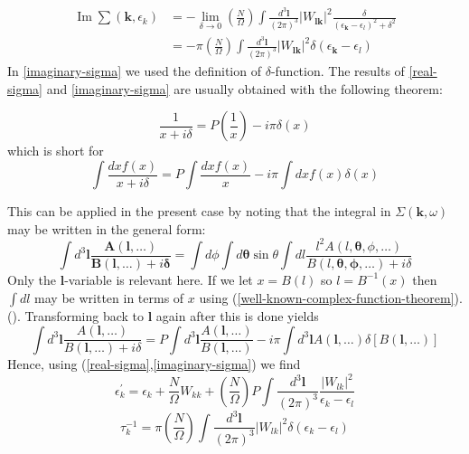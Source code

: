 \begin{equation}\begin{aligned}
\operatorname{Im} \sum\left(\mathbf{k}, \epsilon_{k}\right) &=-\lim _{\delta \rightarrow 0}\left(\frac{N}{\Omega}\right) \int \frac{d^{3} \mathbf{l}}{(2 \pi)^{3}}\left|W_{\mathbf{lk}}\right|^{2} \frac{\delta}{\left(\epsilon_{\mathbf{k}}-\epsilon_{l}\right)^{2}+\delta^{2}} \\
&=-\pi\left(\frac{N}{\Omega}\right) \int \frac{d^{3} \mathbf{l}}{(2 \pi)^{3}}\left|W_{\mathbf{lk}}\right|^{2} \delta\left(\epsilon_{\mathbf{k}}-\epsilon_{l}\right)
\end{aligned}\end{equation}
In \ref{imaginary-sigma} we used the  definition of $\delta$-function. The results of \ref{real-sigma} and \ref{imaginary-sigma} are usually obtained with the following theorem:
\begin{imp}
\begin{equation}\frac{1}{x+i \delta}=P (\frac{1}{x})-i \pi \delta(x)
\label{squeezed-Lorentzian-defi}
\end{equation}
which is short for 
\begin{equation}\int \frac{d x f(x)}{x+i \delta}=P \int \frac{d x f(x)}{x}-i \pi \int d x f(x) \delta(x)
\label{well-known-complex-function-theorem}
\end{equation}
\end{imp}
This can be applied in the present case by noting that the integral in $\Sigma(\mathbf{k},\omega)$ may be written in the general form:
\begin{equation}\int d^{3} \mathbf{l} \frac{\boldsymbol{A}(\mathbf{l}, \ldots)}{\boldsymbol{B}(\mathbf{l}, \ldots)+i \boldsymbol{\delta}}=\int d \phi \int d \boldsymbol{\theta} \sin \theta \int d l  \frac{l^{2}A(l, \boldsymbol{\theta}, \phi, \ldots)}{B(l, \boldsymbol{\theta}, \boldsymbol{\phi}, \ldots)+i \delta}\end{equation}
Only the $\mathbf{l}$-variable is relevant here. If we let $x=B(l)$ so $l=B^{-1}(x)$ then $\int d l$ may be written in terms of $x$ using (\ref{well-known-complex-function-theorem}).(). Transforming back to $\mathbf{l}$ again after this is done yields
$$\int d^{3} \mathbf{l} \frac{A(\mathbf{l}, \ldots)}{B(\mathbf{l}, \ldots)+i \delta}=P \int d^{3} \mathbf{l} \frac{A(\mathbf{l}, \ldots)}{B(\mathbf{l}, \ldots)}-i \pi \int d^{3} \mathbf{l} A(\mathbf{l}, \ldots) \delta[B(\mathbf{l}, \ldots)]$$
Hence, using (\ref{real-sigma},\ref{imaginary-sigma}) we find
\begin{equation}\epsilon_{k}^{\prime}=\epsilon_{k}+\frac{N}{\Omega} W_{k k}+\left(\frac{N}{\Omega}\right) P \int \frac{d^{3} \mathbf{l}}{(2 \pi)^{3}} \frac{\left|W_{l k}\right|^{2}}{\epsilon_{k}-\epsilon_{l}}\end{equation}
\begin{equation}\tau_{k}^{-1}=\pi\left(\frac{N}{\Omega}\right) \int \frac{d^{3} \mathbf{l}}{(2 \pi)^{3}}\left|W_{l k}\right|^{2} \delta\left(\epsilon_{k}-\epsilon_{l}\right)\end{equation}